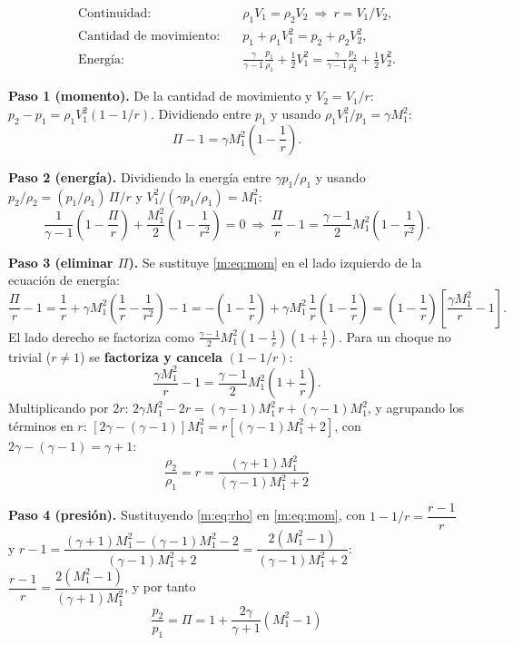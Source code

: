 \begin{align}
\text{Continuidad:}&\quad \rho_1V_1=\rho_2V_2\ \Rightarrow\ r=V_1/V_2,\\
\text{Cantidad de movimiento:}&\quad p_1+\rho_1V_1^2=p_2+\rho_2V_2^2,\\
\text{Energía:}&\quad \tfrac{\gamma}{\gamma-1}\tfrac{p_1}{\rho_1}+\tfrac12V_1^2=\tfrac{\gamma}{\gamma-1}\tfrac{p_2}{\rho_2}+\tfrac12V_2^2.
\end{align}

\textbf{Paso 1 (momento).} De la cantidad de movimiento y $V_2=V_1/r$: $p_2-p_1=\rho_1V_1^2(1-1/r)$. Dividiendo entre $p_1$ y usando $\rho_1V_1^2/p_1=\gamma M_1^2$:
\begin{equation}\Pi-1=\gamma M_1^2\left(1-\frac1r\right).\label{m:eq:mom}\end{equation}

\textbf{Paso 2 (energía).} Dividiendo la energía entre $\gamma p_1/\rho_1$ y usando $p_2/\rho_2=(p_1/\rho_1)\,\Pi/r$ y $V_1^2/(\gamma p_1/\rho_1)=M_1^2$:
\[
\frac{1}{\gamma-1}\left(1-\frac{\Pi}{r}\right)+\frac{M_1^2}{2}\left(1-\frac1{r^2}\right)=0
\ \Longrightarrow\
\frac{\Pi}{r}-1=\frac{\gamma-1}{2}M_1^2\left(1-\frac1{r^2}\right).\label{m:eq:en}
\]

\textbf{Paso 3 (eliminar $\Pi$).} Se sustituye \eqref{m:eq:mom} en el lado izquierdo de la ecuación de energía:
\[
\frac{\Pi}{r}-1=\frac1r+\gamma M_1^2\left(\frac1r-\frac1{r^2}\right)-1=-\left(1-\frac1r\right)+\gamma M_1^2\,\frac1r\left(1-\frac1r\right)
=\left(1-\frac1r\right)\left[\frac{\gamma M_1^2}{r}-1\right].
\]
El lado derecho se factoriza como $\tfrac{\gamma-1}{2}M_1^2\left(1-\tfrac1r\right)\left(1+\tfrac1r\right)$. Para un choque no trivial ($r\ne1$) se
\textbf{factoriza y cancela} $(1-1/r)$:
\[
\frac{\gamma M_1^2}{r}-1=\frac{\gamma-1}{2}M_1^2\left(1+\frac1r\right).
\]
Multiplicando por $2r$: $2\gamma M_1^2-2r=(\gamma-1)M_1^2\,r+(\gamma-1)M_1^2$, y agrupando los términos en $r$:
$\left[2\gamma-(\gamma-1)\right]M_1^2=r\left[(\gamma-1)M_1^2+2\right]$, con $2\gamma-(\gamma-1)=\gamma+1$:
\begin{equation}
\boxed{\frac{\rho_2}{\rho_1}=r=\frac{(\gamma+1)M_1^2}{(\gamma-1)M_1^2+2}}\label{m:eq:rho}
\end{equation}

\textbf{Paso 4 (presión).} Sustituyendo \eqref{m:eq:rho} en \eqref{m:eq:mom}, con $1-1/r=\dfrac{r-1}{r}$ y
$r-1=\dfrac{(\gamma+1)M_1^2-(\gamma-1)M_1^2-2}{(\gamma-1)M_1^2+2}=\dfrac{2(M_1^2-1)}{(\gamma-1)M_1^2+2}$:
$\dfrac{r-1}{r}=\dfrac{2(M_1^2-1)}{(\gamma+1)M_1^2}$, y por tanto
\begin{equation}
\boxed{\frac{p_2}{p_1}=\Pi=1+\frac{2\gamma}{\gamma+1}\left(M_1^2-1\right)}\label{m:eq:pres}
\end{equation}

